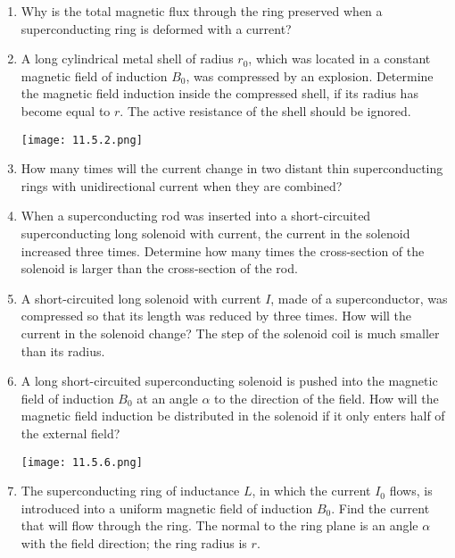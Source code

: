 \documentclass{article}
\begin{document}
\begin{enumerate}[label=11.5.\arabic*]

\item Why is the total magnetic flux through the ring preserved when a superconducting ring is deformed with a current?

\item A long cylindrical metal shell of radius $r_0$, which was located in a constant magnetic field of induction $B_0$, was compressed by an explosion. Determine the magnetic field induction inside the compressed shell, if its radius has become equal to $r$. The active resistance of the shell should be ignored.

\begin{center}
    \texttt{[image: 11.5.2.png]}
\end{center}

\item How many times will the current change in two distant thin superconducting rings with unidirectional current when they are combined?

\item When a superconducting rod was inserted into a short-circuited superconducting long solenoid with current, the current in the solenoid increased three times. Determine how many times the cross-section of the solenoid is larger than the cross-section of the rod.

\item A short-circuited long solenoid with current $I$, made of a superconductor, was compressed so that its length was reduced by three times. How will the current in the solenoid change? The step of the solenoid coil is much smaller than its radius.

\item A long short-circuited superconducting solenoid is pushed into the magnetic field of induction $B_0$ at an angle $\alpha$ to the direction of the field. How will the magnetic field induction be distributed in the solenoid if it only enters half of the external field?

\begin{center}
    \texttt{[image: 11.5.6.png]}
\end{center}


\item The superconducting ring of inductance $L$, in which the current $I_0$ flows, is introduced into a uniform magnetic field of induction $B_0$. Find the current that will flow through the ring. The normal to the ring plane is an angle $\alpha$ with the field direction; the ring radius is $r$.


\end{enumerate}
\end{document}
